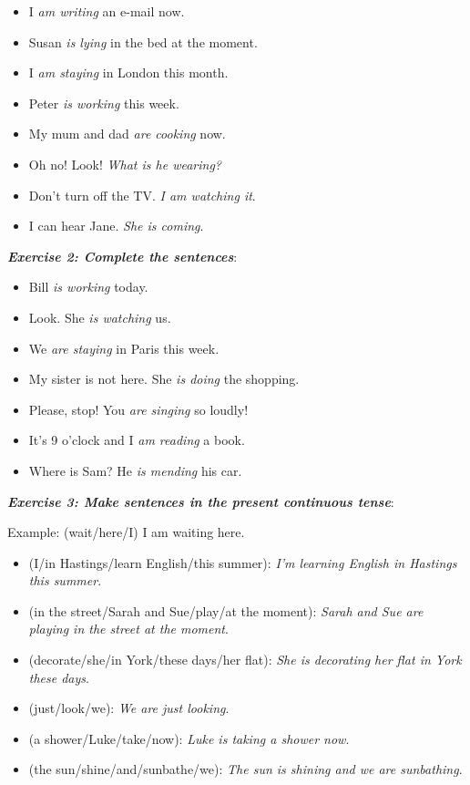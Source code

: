 \begin{itemize}

\item I \textit{am writing} an e-mail now.
\item Susan \textit{is lying} in the bed at the moment.
\item I \textit{am staying} in London this month.
\item Peter \textit{is working} this week.
\item My mum and dad \textit{are cooking} now.
\item Oh no! Look! \textit{What is he wearing?}
\item Don't turn off the TV. \textit{I am watching it}.
\item I can hear Jane. \textit{She is coming}.
\end{itemize}

\textbf{\textit{Exercise 2: Complete the sentences}}:

\begin{itemize}

\item Bill \textit{is working} today.
\item Look. She \textit{is watching} us.
\item We \textit{are staying} in Paris this week.
\item My sister is not here. She \textit{is doing} the shopping.
\item Please, stop! You \textit{are singing} so loudly!
\item It's 9 o'clock and I \textit{am reading} a book.
\item Where is Sam? He \textit{is mending} his car.

\end{itemize}

\textbf{\textit{Exercise 3: Make sentences in the present continuous tense}}:

Example:
(wait/here/I) I am waiting here.

\begin{itemize}

\item (I/in Hastings/learn English/this summer): \textit{I'm learning English in Hastings this summer}.
\item (in the street/Sarah and Sue/play/at the moment): \textit{Sarah and Sue are playing in the street at the moment}.
\item (decorate/she/in York/these days/her flat): \textit{She is decorating her flat in York these days}.
\item (just/look/we): \textit{We are just looking}.
\item (a shower/Luke/take/now): \textit{Luke is taking a shower now}.
\item (the sun/shine/and/sunbathe/we): \textit{The sun is shining and we are sunbathing}.

\end{itemize}

